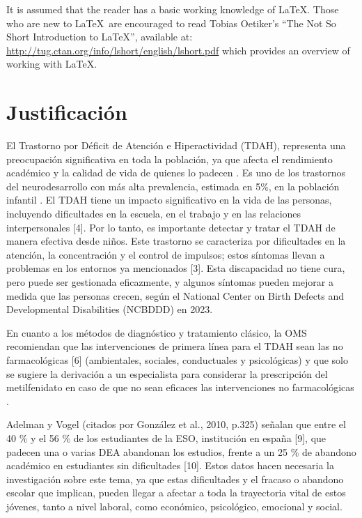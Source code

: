 \documentclass[10pt,journal,compsoc]{IEEEtran}
\begin{document}
It is assumed that the reader has a basic working knowledge of \LaTeX. Those who are new to \LaTeX \ are encouraged to read Tobias Oetiker's ``The Not So Short Introduction to \LaTeX '', available at: \url{http://tug.ctan.org/info/lshort/english/lshort.pdf} which provides an overview of working with \LaTeX.

\section{Justificación}
El Trastorno por Déficit de Atención e Hiperactividad (TDAH), representa una preocupación significativa en toda la población, ya que afecta el rendimiento académico y la calidad de vida de quienes lo padecen \cite{aparicio2024tecnologias}. Es uno de los trastornos del neurodesarrollo con más alta prevalencia, estimada en 5\%, en la población infantil \cite{boechi2023tecnologias}. El TDAH tiene un impacto significativo en la vida de las personas, incluyendo dificultades en la escuela, en el trabajo y en las relaciones interpersonales [4]. Por lo tanto, es importante detectar y tratar el TDAH de manera efectiva desde niños. Este trastorno se caracteriza por dificultades en la atención, la concentración y el control de impulsos; estos síntomas llevan a problemas en los entornos ya mencionados [3]. Esta discapacidad no tiene cura, pero puede ser gestionada eficazmente, y algunos síntomas pueden mejorar a medida que las personas crecen, según el National Center on Birth Defects and Developmental Disabilities (NCBDDD) en 2023.

En cuanto a los métodos de diagnóstico y tratamiento clásico, la OMS recomiendan que las intervenciones de primera línea para el TDAH sean las no farmacológicas [6] (ambientales, sociales, conductuales y psicológicas) y que solo se sugiere la derivación a un especialista para considerar la prescripción del metilfenidato en caso de que no sean eficaces las intervenciones no farmacológicas \cite{boechi2023tecnologias}.

Adelman y Vogel (citados por González et al., 2010, p.325) señalan que entre el 40 \% y el 56 \% de los estudiantes de la ESO, institución en españa [9], que padecen una o varias DEA abandonan los estudios, frente a un 25 \% de abandono académico en estudiantes sin dificultades [10]. Estos datos hacen necesaria la investigación sobre este tema, ya que estas dificultades y el fracaso o abandono escolar que implican, pueden llegar a afectar a toda la trayectoria vital de estos jóvenes, tanto a nivel laboral, como económico, psicológico, emocional y social.
\end{document}

